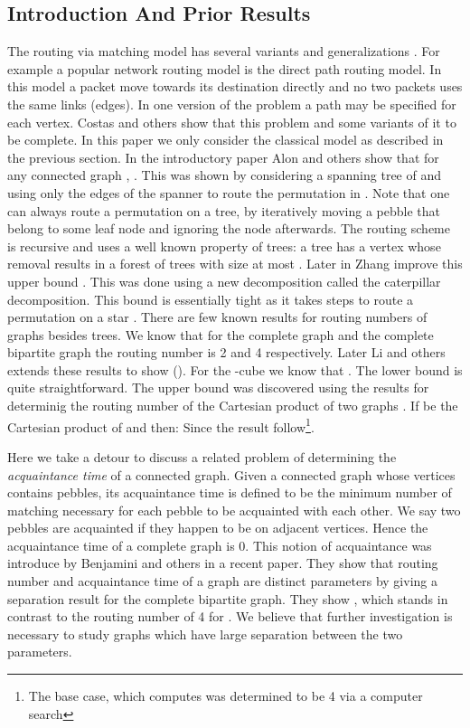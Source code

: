 \documentclass[runningheads,a4paper]{llncs}
\begin{document}
\subsection{Introduction And Prior Results}
The routing via matching model has several variants and generalizations \cite{5,6,8}. For example a popular network routing model is the direct path routing model. In this model a packet move towards its destination directly and no two packets uses the same links (edges). In one version of the problem a path may be specified for each vertex. Costas and others \cite{8} show that this problem and some variants of it to be  complete.  In this paper we only consider the classical model as described in the previous section.  In the introductory paper Alon and others \cite{5}  show that for any connected graph , . This was shown by considering a spanning tree of  and using only the edges of the spanner to route the permutation in . Note that one can always route a permutation on a tree, by iteratively moving a pebble that belong to some leaf node and ignoring the node afterwards. The routing scheme is recursive and uses a well known property of trees: a tree has a vertex whose removal results in a forest of trees with size at most .
Later in \cite{7} Zhang improve this upper bound . This was done using a new decomposition called the caterpillar decomposition. This bound is essentially tight as it takes  steps to route a permutation on a star . There are  few known results for routing numbers of graphs besides trees. We know that for the complete graph and the complete bipartite graph the routing number is 2 and 4 respectively\cite{5}. Later Li and others \cite{6} extends these results to show  (). For the -cube  we know that . The lower bound is quite straightforward. The upper bound was discovered using the results for determinig the routing number of the Cartesian product of two graphs \cite{5}. If  be the Cartesian product of  and  then: 
Since  the result follow\footnote{The base case, which computes  was determined to be 4 via a computer search\cite{6}}. 

Here we take a detour to discuss a related problem of determining the \textit{acquaintance time} of a connected graph. Given a connected graph  whose vertices contains pebbles, its acquaintance time  is defined to be the minimum number of matching necessary for each pebble to be acquainted with  each other. We say two pebbles are acquainted if they happen to be on adjacent vertices. Hence the acquaintance time of a complete graph is 0. This notion  of acquaintance  was introduce by Benjamini and others in a recent paper\cite{9}. They show that routing number and acquaintance time of a graph are distinct parameters by giving a separation result for the complete bipartite graph. They show , which stands in  contrast to the routing number of 4 for . We believe that further investigation is necessary to study graphs which have large separation between the two parameters.
\end{document}
